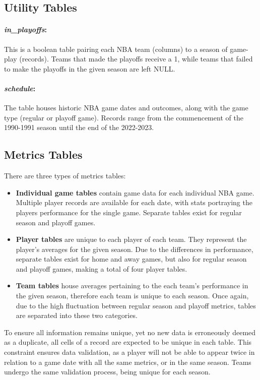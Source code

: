 \documentclass{thesis-ekf}
\theoremstyle{definition}
\theoremstyle{remark}
\begin{document}
{\subsection{Utility Tables} 
\paragraph{\emph{in\_playoffs}:} This is a boolean table pairing each NBA team (columns) to a season of game-play (records). Teams that made the playoffs receive a 1, while teams that failed to make the playoffs in the given season are left NULL.

\paragraph{\emph{schedule}:} The table houses historic NBA game dates and outcomes, along with the game type (regular or playoff game). Records range from the commencement of the 1990-1991 season until the end of the 2022-2023.

\subsection{Metrics Tables}
There are three types of metrics tables:
\begin{itemize}
	\item \textbf{Individual game tables} contain game data for each individual NBA game. Multiple player records are available for each date, with stats portraying the players performance for the single game. Separate tables exist for regular season and playoff games.
	
	\item \textbf{Player tables} are unique to each player of each team. They represent the player's averages for the given season. Due to the differences in performance, separate tables exist for home and away games, but also for regular season and playoff games, making a total of four player tables.
	
	\item \textbf{Team tables} house averages pertaining to the each team's performance in the given season, therefore each team is unique to each season. Once again, due to the high fluctuation between regular season and playoff metrics, tables are separated into these two categories.
\end{itemize}
To ensure all information remains unique, yet no new data is erroneously deemed as a duplicate, all cells of a record are expected to be unique in each table. This constraint ensures data validation, as a player will not be able to appear twice in relation to a game date with all the same metrics, or in the same season. Teams undergo the same validation process, being unique for each season.

}
\end{document}
